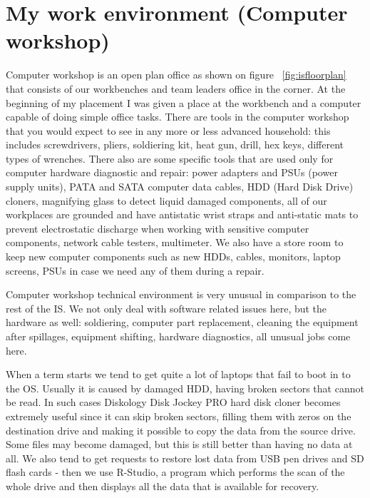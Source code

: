 \documentclass[10pt,a4paper,headinclude=true,twoside]{report}
\begin{document}
\section{My work environment (Computer workshop)}
Computer workshop is an open plan office as shown on figure ~\ref{fig:isfloorplan} that consists of our workbenches and team leaders office in the corner. At the beginning of my placement I was given a place at the workbench and a computer capable of doing simple office tasks. There are tools in the computer workshop that you would expect to see in any more or less advanced household: this includes screwdrivers, pliers, soldiering kit, heat gun, drill, hex keys, different types of wrenches. There also are some specific tools that are used only for computer hardware diagnostic and repair: power adapters and PSUs (power supply units), PATA and SATA computer data cables, HDD (Hard Disk Drive) cloners, magnifying glass to detect liquid damaged components, all of our workplaces are grounded and have antistatic wrist straps and anti-static mats to prevent electrostatic discharge when working with sensitive computer components, network cable testers, multimeter. We also have a store room to keep new computer components such as new HDDs, cables, monitors, laptop screens, PSUs in case we need any of them during a repair.    

Computer workshop technical environment is very unusual in comparison to the rest of the IS. We not only deal with software related issues here, but the hardware as well: soldiering, computer part replacement, cleaning the equipment after spillages, equipment shifting, hardware diagnostics, all unusual jobs come here.

When a term starts we tend to get quite a lot of laptops that fail to boot in to the OS. Usually it is caused by damaged HDD, having broken sectors that cannot be read. In such cases Diskology Disk Jockey PRO hard disk cloner\cite{DiskCloner} becomes extremely useful since it can skip broken sectors, filling them with zeros on the destination drive and making it possible to copy the data from the source drive. Some files may become damaged, but this is still better than having no data at all. We also tend to get requests to restore lost data from USB pen drives and SD flash cards - then we use R-Studio, a program which performs the scan of the whole drive and then displays all the data that is available for recovery. 
\end{document}
